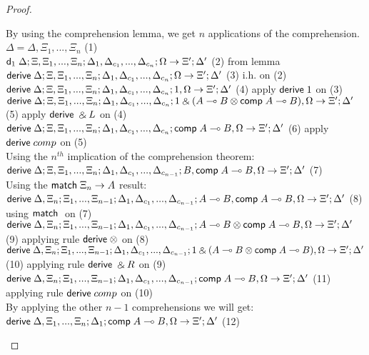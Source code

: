 \begin{proof}
\begin{itemize}
      By using the comprehension lemma, we get $n$ applications of the comprehension.\\
      $\Delta = \Delta, \Xi_1, ..., \Xi_n$ \hfill (1)\\
      $\mathsf{d}_1 \; \Delta; \Xi, \Xi_1, ..., \Xi_n; \Delta_1, \Delta_{c_1}, ..., \Delta_{c_n}; \Omega \rightarrow \Xi'; \Delta'$ \hfill (2) from lemma \\
      $\mathsf{derive} \; \Delta; \Xi, \Xi_1, ..., \Xi_n; \Delta_1, \Delta_{c_1}, ..., \Delta_{c_n}; \Omega \rightarrow \Xi'; \Delta'$ \hfill (3) i.h. on (2) \\
      $\mathsf{derive} \; \Delta; \Xi, \Xi_1, ..., \Xi_n; \Delta_1, \Delta_{c_1}, ..., \Delta_{c_n}; 1, \Omega \rightarrow \Xi'; \Delta'$ \hfill (4) apply $\mathsf{derive} \; 1$ on (3) \\
      $\mathsf{derive} \; \Delta; \Xi, \Xi_1, ..., \Xi_n; \Delta_1, \Delta_{c_1}, ..., \Delta_{c_n}; 1 \mathbin{\binampersand} (A \multimap B \otimes \mathsf{comp} \; A \multimap B), \Omega \rightarrow \Xi'; \Delta'$ \hfill (5) apply $\mathsf{derive} \; \mathbin{\binampersand} L$ on (4) \\
      $\mathsf{derive} \; \Delta; \Xi, \Xi_1, ..., \Xi_n; \Delta_1, \Delta_{c_1}, ..., \Delta_{c_n}; \mathsf{comp} \; A \multimap B, \Omega \rightarrow \Xi'; \Delta'$ \hfill (6) apply $\mathsf{derive} \; comp$ on (5) \\
      Using the $n^{th}$ implication of the comprehension theorem:\\
      $\mathsf{derive} \; \Delta; \Xi, \Xi_1, ..., \Xi_n; \Delta_1, \Delta_{c_1}, ..., \Delta_{c_{n-1}}; B, \mathsf{comp} \; A \multimap B, \Omega \rightarrow \Xi'; \Delta'$ \hfill (7) \\
      Using the $\mathsf{match} \; \Xi_n \rightarrow A$ result: \\
      $\mathsf{derive} \; \Delta, \Xi_n; \Xi_1, ..., \Xi_{n-1}; \Delta_1, \Delta_{c_1}, ..., \Delta_{c_{n-1}}; A \multimap B, \mathsf{comp} \; A \multimap B, \Omega \rightarrow \Xi'; \Delta'$ \hfill (8) using $\mathsf{match} \;$ on (7) \\
      $\mathsf{derive} \; \Delta, \Xi_n; \Xi_1, ..., \Xi_{n-1}; \Delta_1, \Delta_{c_1}, ..., \Delta_{c_{n-1}}; A \multimap B \otimes \mathsf{comp} \; A \multimap B, \Omega \rightarrow \Xi'; \Delta'$ \hfill (9) applying rule $\mathsf{derive} \; \otimes$ on (8) \\
      $\mathsf{derive} \; \Delta, \Xi_n; \Xi_1, ..., \Xi_{n-1}; \Delta_1, \Delta_{c_1}, ..., \Delta_{c_{n-1}}; 1 \mathbin{\binampersand} (A \multimap B \otimes \mathsf{comp} \; A \multimap B), \Omega \rightarrow \Xi'; \Delta'$ \hfill (10) applying rule $\mathsf{derive} \; \mathbin{\binampersand} R$ on (9) \\
      $\mathsf{derive} \; \Delta, \Xi_n; \Xi_1, ..., \Xi_{n-1}; \Delta_1, \Delta_{c_1}, ..., \Delta_{c_{n-1}}; \mathsf{comp} \; A \multimap B, \Omega \rightarrow \Xi'; \Delta'$ \hfill (11) applying rule $\mathsf{derive} \; comp$ on (10) \\
      By applying the other $n-1$ comprehensions we will get: \\
      $\mathsf{derive} \; \Delta, \Xi_1, ..., \Xi_n; \Delta_1; \mathsf{comp} \; A \multimap B, \Omega \rightarrow \Xi'; \Delta'$ \hfill (12)
   \end{itemize}
\end{proof}
